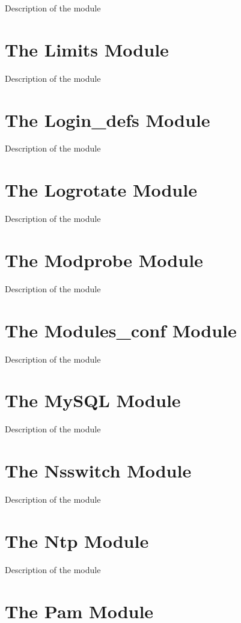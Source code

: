Description of the module

\section{The Limits Module}

Description of the module

\section{The Login\_defs Module}

Description of the module

\section{The Logrotate Module}

Description of the module

\section{The Modprobe Module}

Description of the module

\section{The Modules\_conf Module}

Description of the module

\section{The MySQL Module}

Description of the module

\section{The Nsswitch Module}

Description of the module

\section{The Ntp Module}

Description of the module

\section{The Pam Module}

